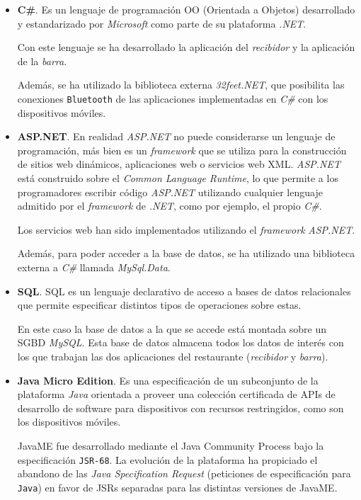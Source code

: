   \begin{itemize} 
  \item \textbf{C\#}.
  Es un lenguaje de programación \acs{OO} (Orientada a Objetos) desarrollado y
  estandarizado por \emph{Microsoft} como parte de su plataforma \emph{.NET}.

  Con este lenguaje se ha desarrollado la aplicación del \emph{recibidor} y
  la aplicación de la \emph{barra}.

  Además, se ha utilizado la biblioteca externa \emph{32feet.NET}, que
  posibilita las conexiones \texttt{Bluetooth} de las aplicaciones implementadas
  en \emph{C\#} con los dispositivos móviles.

  \item \textbf{ASP.NET}.
  En realidad \emph{ASP.NET} no puede 
  considerarse un lenguaje de programación, más bien es un \emph{framework} 
  que se utiliza para la construcción de sitios web dinámicos, aplicaciones 
  web o servicios web \acs{XML}. \emph{ASP.NET} está construido sobre el
  \emph{Common Language Runtime}, lo que permite a los programadores escribir 
  código \emph{ASP.NET} utilizando cualquier lenguaje admitido por el
  \emph{framework} de \emph{.NET}, como por ejemplo, el propio \emph{C\#}.

  Los servicios web han sido implementados utilizando el \emph{framework}
  \emph{ASP.NET}.

  Además, para poder acceder a la base de datos, se ha utilizado una biblioteca
  externa a \emph{C\#} llamada \emph{MySql.Data}.

  \item \textbf{SQL}.
  \acs{SQL} es un lenguaje declarativo de acceso a bases de
  datos relacionales que permite especificar distintos tipos de operaciones
  sobre estas.

  En este caso la base de datos a la que se accede está montada sobre un
  \acs{SGBD} \emph{MySQL}. Esta base de datos almacena todos los datos de
  interés con los que trabajan las dos aplicaciones del restaurante
  (\emph{recibidor} y \emph{barra}).

  \item \textbf{Java Micro Edition}.
  Es una especificación de un subconjunto de la
  plataforma \emph{Java} orientada a proveer una colección certificada de
  \acs{API}s de desarrollo de software para dispositivos con recursos
  restringidos, como son los dispositivos móviles.

  \acs{JavaME} fue desarrollado mediante el Java Community Process bajo la 
  especificación \texttt{\acs{JSR}-68}. La evolución de la plataforma ha 
  propiciado el abandono de las \emph{Java Specification Request} (peticiones  
  de especificación para \texttt{Java}) en favor de \acs{JSR}s separadas para  
  las distintas versiones de \acs{JavaME}.


\end{itemize}
